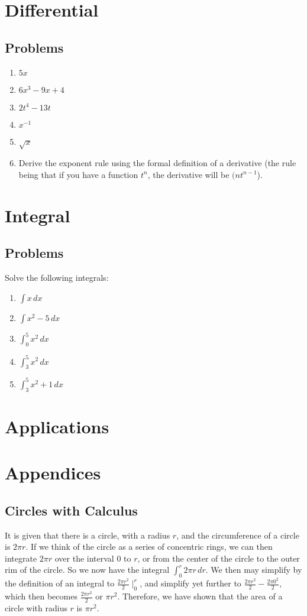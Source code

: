 \documentclass{book}
\begin{document}
\part{Differential}



\chapter{Problems}
\begin{enumerate}
    \item $5x$
    \item $6x^3 - 9x + 4$
    \item $2t^4 - 13t$
    \item $x^{-1}$
    \item $\sqrt{x}$
    \item Derive the exponent rule using the formal definition of a derivative (the rule being that if you have a function $t^n$, the derivative will be $(nt^{n-1}$).
\end{enumerate}
\part{Integral}



\chapter{Problems}
Solve the following integrals:

\begin{enumerate}
    \item $\int x \, dx$
    \item $\int x^2-5 \, dx$
    \item $\int^5_0 x^2 \, dx$
    \item $\int^5_3 x^2 \, dx$
    \item $\int^5_3 x^2 + 1 \, dx$
\end{enumerate}
\part{Applications}


\backmatter
\part{Appendices}
\appendix
\chapter{Circles with Calculus}
It is given that there is a circle, with a radius $r$, and the circumference of a circle is $2\pi r$. If we think of the circle as a series of concentric rings, we can then integrate $2\pi r$ over the interval $0$ to $r$, or from the center of the circle to the outer rim of the circle. So we now have the integral $\int^r_0 2\pi r\, dr$. We then may simplify by the definition of an integral to $\frac{2\pi r^2}{2}\mid^r_0$, and simplify yet further to $\frac{2\pi r^2}{2}-\frac{2\pi 0^2}{2}$, which then becomes $\frac{2\pi r^2}{2}$ or $\pi r^2$. Therefore, we have shown that the area of a circle with radius $r$ is $\pi r^2$.
\end{document}
